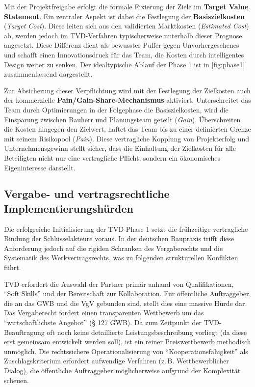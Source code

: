 \clearpage

Mit der Projektfreigabe erfolgt die formale Fixierung der Ziele im \textbf{Target Value Statement}. Ein zentraler Aspekt ist dabei die Festlegung der \textbf{Basiszielkosten} (\textit{Target Cost}). Diese leiten sich aus den validierten Marktkosten (\textit{Estimated Cost}) ab, werden jedoch im \acs{TVD}-Verfahren typischerweise unterhalb dieser Prognose angesetzt. Diese Differenz dient als bewusster Puffer gegen Unvorhergesehenes und schafft einen Innovationsdruck für das Team, die Kosten durch intelligentes Design weiter zu senken. \autocite[Vgl.][S.~10]{ballard_target_2025} Der idealtypische Ablauf der Phase 1 ist in \cref{fig:phase1} zusammenfassend dargestellt.

Zur Absicherung dieser Verpflichtung wird mit der Festlegung der Zielkosten auch der kommerzielle \textbf{Pain/Gain-Share-Mechanismus} aktiviert. Unterschreitet das Team durch Optimierungen in der Folgephase die Basiszielkosten, wird die Einsparung zwischen Bauherr und Planungsteam geteilt (\textit{Gain}). Überschreiten die Kosten hingegen den Zielwert, haftet das Team bis zu einer definierten Grenze mit seinem Risikopool (\textit{Pain}). Diese vertragliche Kopplung von Projekterfolg und Unternehmensgewinn stellt sicher, dass die Einhaltung der Zielkosten für alle Beteiligten nicht nur eine vertragliche Pflicht, sondern ein ökonomisches Eigeninteresse darstellt. \autocite[Vgl.][S.~14]{ballard_target_2012}\,\autocite[Vgl.][S.~30]{ballard_target_2025}



\FloatBarrier

\subsection{Vergabe- und vertragsrechtliche Implementierungshürden}
\label{sec:4.3.4}

Die erfolgreiche Initialisierung der \acs{TVD}-Phase 1 setzt die frühzeitige vertragliche Bindung der Schlüsselakteure voraus. In der deutschen Baupraxis trifft diese Anforderung jedoch auf die rigiden Schranken des Vergaberechts und die Systematik des Werkvertragsrechts, was zu folgenden strukturellen Konflikten führt.

\acs{TVD} erfordert die Auswahl der Partner primär anhand von Qualifikationen, \enquote{Soft Skills} und der Bereitschaft zur Kollaboration. Für öffentliche Auftraggeber, die an das GWB und die VgV gebunden sind, stellt dies eine massive Hürde dar.
Das Vergaberecht fordert einen transparenten Wettbewerb um das \enquote{wirtschaftlichste Angebot} (§ 127 GWB).\autocite[Vgl.][§~127]{noauthor_gesetz_2013} Da zum Zeitpunkt der \acs{TVD}-Beauftragung oft noch keine detaillierte Leistungsbeschreibung vorliegt (da diese erst gemeinsam entwickelt werden soll), ist ein reiner Preiswettbewerb methodisch unmöglich. Die rechtssichere Operationalisierung von \enquote{Kooperationsfähigkeit} als Zuschlagskriterium erfordert aufwendige Verfahren (z.\,B. Wettbewerblicher Dialog), die öffentliche Auftraggeber möglicherweise aufgrund der Komplexität scheuen.

